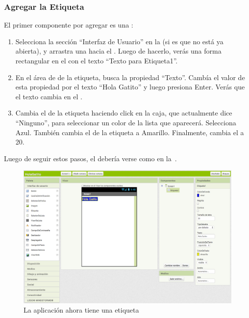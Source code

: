\documentclass[letterpaper]{article}
\begin{document}
\subsubsection*{Agregar la Etiqueta}

El primer componente por agregar es una :

\begin{enumerate}

\item Selecciona la sección ``Interfaz de Usuario'' en la \palette (si
  es que no está ya abierta), y arrastra una 
  hacia el \viewer. Luego de hacerlo, verás una forma rectangular en
  el \viewer con el texto ``Texto para Etiqueta1''.

\item En el área de \properties de la etiqueta, busca la propiedad
  ``Texto''. Cambía el valor de esta propiedad por el texto ``Hola
  Gatito'' y luego presiona Enter. Verás que el texto cambia en el
  \viewer.

\item Cambia el \backgroundColor de la etiqueta haciendo click en la
  caja, que actualmente dice ``Ninguno'', para seleccionar un color de
  la lista que aparecerá. Selecciona Azul. También cambia el
  \textColor de la etiqueta a Amarillo. Finalmente, cambia el
  \fontSize a 20.

\end{enumerate}

Luego de seguir estos pasos, el \designer debería verse como en
la~.

\begin{figure}[H]
\centering
\includegraphics[scale=0.25]{figures/holaGatitoStep1}
\caption{La aplicación ahora tiene una etiqueta}
\label{fig:holaGatitoStep1}
\end{figure}
\end{document}
